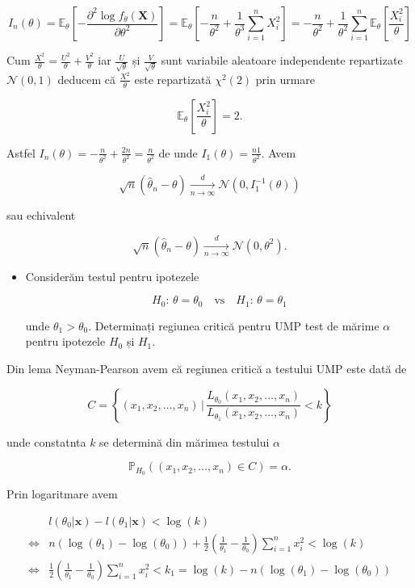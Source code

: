 \documentclass[]{article}
\newenvironment{frshaded*}{%
  \def\FrameCommand{\fboxrule=\FrameRule\fboxsep=\FrameSep \fcolorbox{framecolor}{shadecolor1}}%
  \MakeFramed {\advance\hsize-\width \FrameRestore}}%
{\endMakeFramed}
\newenvironment{rmdblock}[1]
  {\begin{frshaded*}
  \begin{itemize}
  \renewcommand{\labelitemi}{
    \raisebox{-.7\height}[0pt][0pt]{
      {\setkeys{Gin}{width=2em,keepaspectratio}\texttt{[image: images/icons/\#1]}}
    }
  }
  \item
  }
  {
  \end{itemize}
  \end{frshaded*}
  }
\newenvironment{rmdexercise}
  {\begin{rmdblock}{exercise}}
  {\end{rmdblock}}
\begin{document}
\[
  I_n(\theta) = \mathbb{E}_{\theta}\left[-\frac{\partial^2 \log f_{\theta}(\mathbf{X})}{\partial\theta^2}\right] = \mathbb{E}_{\theta}\left[-\frac{n}{\theta^2} + \frac{1}{\theta^3}\sum_{i = 1}^{n}X_i^2\right] = -\frac{n}{\theta^2} + \frac{1}{\theta^2}\sum_{i = 1}^{n}\mathbb{E}_{\theta}\left[\frac{X_i^2}{\theta}\right]
\]

Cum \(\frac{X^2}{\theta} = \frac{U^2}{\theta} + \frac{V^2}{\theta}\) iar
\(\frac{U}{\sqrt{\theta}}\) și \(\frac{V}{\sqrt{\theta}}\) sunt
variabile aleatoare independente repartizate \(\mathcal{N}(0,1)\)
deducem că \(\frac{X^2}{\theta}\) este repartizată \(\chi^2(2)\) prin
urmare

\[
  \mathbb{E}_{\theta}\left[\frac{X_i^2}{\theta}\right] = 2.
\]

Astfel
\(I_n(\theta) = -\frac{n}{\theta^2} + \frac{2n}{\theta^2} = \frac{n}{\theta^2}\)
de unde \(I_1(\theta) = \frac{n1}{\theta^2}\). Avem

\[
  \sqrt{n}\left(\hat{\theta}_n - \theta\right) \underset{n\to\infty}{\overset{d}{\longrightarrow}} \mathcal{N}(0,I_1^{-1}(\theta)) 
\]

sau echivalent

\[
  \sqrt{n}\left(\hat{\theta}_n - \theta\right) \underset{n\to\infty}{\overset{d}{\longrightarrow}} \mathcal{N}(0,\theta^2). 
\]

\begin{rmdexercise}
Considerăm testul pentru ipotezele

\[
  H_0:\, \theta = \theta_0 \quad \text{vs}\quad H_1:\, \theta = \theta_1
\]

unde \(\theta_1>\theta_0\). Determinați regiunea critică pentru UMP test
de mărime \(\alpha\) pentru ipotezele \(H_0\) și \(H_1\).
\end{rmdexercise}

Din lema Neyman-Pearson avem că regiunea critică a testului UMP este
dată de

\[
  C = \left\{(x_1,x_2,\ldots,x_n)\,|\,\frac{L_{\theta_0}(x_1,x_2,\ldots,x_n)}{L_{\theta_1}(x_1,x_2,\ldots,x_n)}<k\right\}
\]

unde constatnta \(k\) se determină din mărimea testului \(\alpha\)

\[
  \mathbb{P}_{H_0}((x_1,x_2,\ldots,x_n)\in C) = \alpha.
\]

Prin logaritmare avem

\begin{align*}
   & l(\theta_0|\mathbf{x}) -  l(\theta_1|\mathbf{x}) < \log(k)\\
   \iff & n\left(\log(\theta_1) - \log(\theta_0)\right) + \frac{1}{2}\left(\frac{1}{\theta_1} - \frac{1}{\theta_0}\right)\sum_{i = 1}^{n}x_i^2 < \log(k)\\
   \iff & \frac{1}{2}\left(\frac{1}{\theta_1} - \frac{1}{\theta_0}\right)\sum_{i = 1}^{n}x_i^2 < k_1 = \log(k) - n\left(\log(\theta_1) - \log(\theta_0)\right)
\end{align*}
\end{document}
